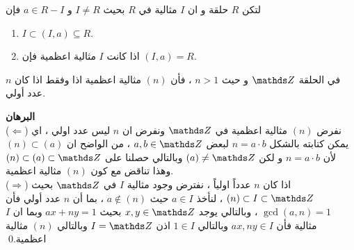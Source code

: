  \begin{note}
 	لتكن $R$ حلقة و ان $I$ مثالية في $R$ بحيث  $I\neq R$ و $a\in R - I$ فإن
 	\begin{enumerate}
 		\item $I\subset (I, a) \subseteq R $.
 		\item  اذا كانت $I$ مثالية اعظمية فإن $(I, a) = R$.
 	\end{enumerate}
 \end{note}
 
 \begin{theorem}
 	في الحلقة $\Z$ و حيث $n>1$ ، فأن $(n)$ مثالية اعظمية اذا وفقط اذا كان $n$ عدد أولي.
 \end{theorem}
 
 \noindent
 \textbf{البرهان}\\
 \noindent
 ($\Leftarrow$) نفرض $(n)$ مثالية اعظمية في $\Z$ ونفرض ان $n$ ليس عدد اولي ، اي يمكن كتابته بالشكل $n=a\cdot b$ لبعض $a, b\in \Z$ ، من الواضح ان $(n) \subset (a)$ لأن $n=a\cdot b$ و لكن $(a)\neq \Z$ وبالتالي حصلنا على $(n) \subset (a) \subset \Z$ وهذا تناقض مع كون $(n)$ مثالية اعظمية.\\
 ($\Rightarrow$) اذا كان $n$ عدداً اولياً ، نفترض وجود مثالية $I$ في $\Z$ بحيث $(n )\subset I \subset \Z$ ، لنأخذ $a\in I$ حيث $a\notin (n)$ ، بما أن $n$  عدد أولي فأن $\gcd(a, n) = 1$ ، وبالتالي يوجد $x, y\in \Z$ بحيث $ax + ny=1$ وبما ان $I$ مثالية فأن $ax, ny\in I$ وبالتالي $1\in I$ اذن $I = \Z$ وبالتالي $(n)$ مثالية اعظمية.\qed  
 
 